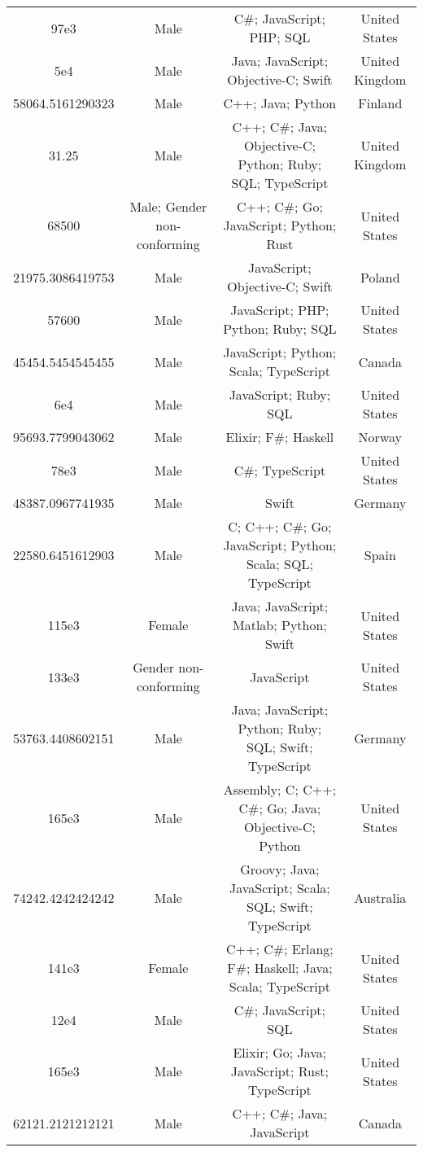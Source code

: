 \begin{center}
\begin{tabular}{ |c|c|c|c| }
97e3  &  Male  &  C\#; JavaScript; PHP; SQL  &  United States  \\ 
5e4  &  Male  &  Java; JavaScript; Objective-C; Swift  &  United Kingdom  \\ 
58064.5161290323  &  Male  &  C++; Java; Python  &  Finland  \\ 
31.25  &  Male  &  C++; C\#; Java; Objective-C; Python; Ruby; SQL; TypeScript  &  United Kingdom  \\ 
68500  &  Male; Gender non-conforming  &  C++; C\#; Go; JavaScript; Python; Rust  &  United States  \\ 
21975.3086419753  &  Male  &  JavaScript; Objective-C; Swift  &  Poland  \\ 
57600  &  Male  &  JavaScript; PHP; Python; Ruby; SQL  &  United States  \\ 
45454.5454545455  &  Male  &  JavaScript; Python; Scala; TypeScript  &  Canada  \\ 
6e4  &  Male  &  JavaScript; Ruby; SQL  &  United States  \\ 
95693.7799043062  &  Male  &  Elixir; F\#; Haskell  &  Norway  \\ 
78e3  &  Male  &  C\#; TypeScript  &  United States  \\ 
48387.0967741935  &  Male  &  Swift  &  Germany  \\ 
22580.6451612903  &  Male  &  C; C++; C\#; Go; JavaScript; Python; Scala; SQL; TypeScript  &  Spain  \\ 
115e3  &  Female  &  Java; JavaScript; Matlab; Python; Swift  &  United States  \\ 
133e3  &  Gender non-conforming  &  JavaScript  &  United States  \\ 
53763.4408602151  &  Male  &  Java; JavaScript; Python; Ruby; SQL; Swift; TypeScript  &  Germany  \\ 
165e3  &  Male  &  Assembly; C; C++; C\#; Go; Java; Objective-C; Python  &  United States  \\ 
74242.4242424242  &  Male  &  Groovy; Java; JavaScript; Scala; SQL; Swift; TypeScript  &  Australia  \\ 
141e3  &  Female  &  C++; C\#; Erlang; F\#; Haskell; Java; Scala; TypeScript  &  United States  \\ 
12e4  &  Male  &  C\#; JavaScript; SQL  &  United States  \\ 
165e3  &  Male  &  Elixir; Go; Java; JavaScript; Rust; TypeScript  &  United States  \\ 
62121.2121212121  &  Male  &  C++; C\#; Java; JavaScript  &  Canada  \\ 

\end{tabular}
\end{center}
